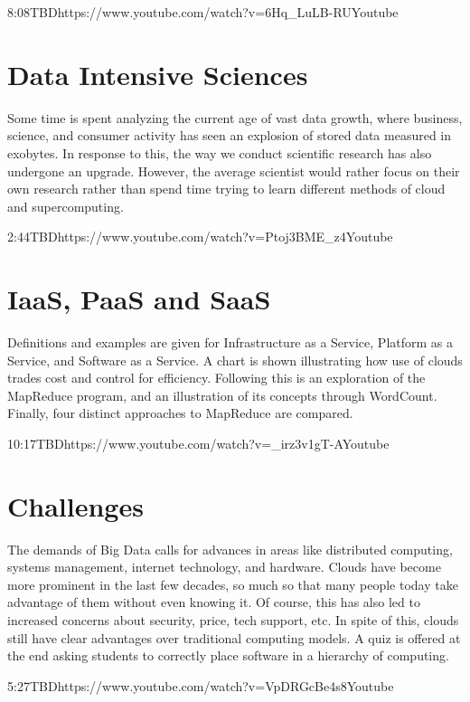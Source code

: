   {8:08}{TBD}{https://www.youtube.com/watch?v=6Hq_LuLB-RU}{Youtube}


\section{Data Intensive Sciences}

Some time is spent analyzing the current age of vast data growth, where
business, science, and consumer activity has seen an explosion of stored
data measured in exobytes. In response to this, the way we conduct
scientific research has also undergone an upgrade. However, the average
scientist would rather focus on their own research rather than spend
time trying to learn different methods of cloud and supercomputing.

  {2:44}{TBD}{https://www.youtube.com/watch?v=Ptoj3BME_z4}{Youtube}


\section{IaaS, PaaS and SaaS}

Definitions and examples are given for Infrastructure as a Service,
Platform as a Service, and Software as a Service. A chart is shown
illustrating how use of clouds trades cost and control for efficiency.
Following this is an exploration of the MapReduce program, and an
illustration of its concepts through WordCount. Finally, four distinct
approaches to MapReduce are compared.

  {10:17}{TBD}{https://www.youtube.com/watch?v=_irz3v1gT-A}{Youtube}


\section{Challenges}

The demands of Big Data calls for advances in areas like distributed
computing, systems management, internet technology, and hardware. Clouds
have become more prominent in the last few decades, so much so that many
people today take advantage of them without even knowing it. Of course,
this has also led to increased concerns about security, price, tech
support, etc. In spite of this, clouds still have clear advantages over
traditional computing models. A quiz is offered at the end asking
students to correctly place software in a hierarchy of computing.

  {5:27}{TBD}{https://www.youtube.com/watch?v=VpDRGcBe4s8}{Youtube}


